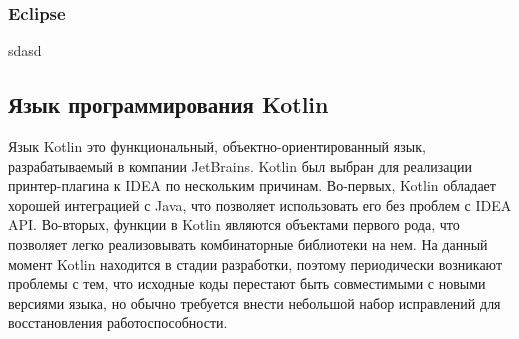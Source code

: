 \subsubsection{Eclipse}
sdasd



\subsection{Язык программирования Kotlin}

Язык Kotlin это функциональный, объектно-ориентированный язык,
разрабатываемый в компании JetBrains.
Kotlin был выбран для реализации принтер-плагина к IDEA по нескольким причинам. 
Во-первых, Kotlin обладает хорошей интеграцией с Java, что позволяет
использовать его без проблем с IDEA API. 
Во-вторых, функции в Kotlin являются объектами первого рода, что позволяет
легко реализовывать комбинаторные библиотеки на нем.
На данный момент Kotlin находится в стадии разработки, поэтому
периодически возникают
проблемы с тем, что исходные коды перестают быть совместимыми с новыми
версиями языка,
но обычно требуется внести небольшой набор исправлений для
восстановления работоспособности.
